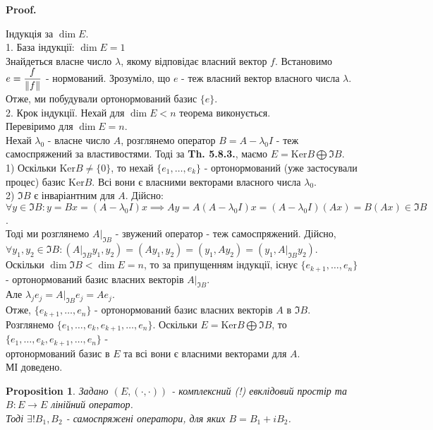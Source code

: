 \documentclass[a4paper, 10pt]{article}
\makeatletter
\def\qed{$\blacksquare$}
\def\ker#1{\textrm{Ker} {#1}}
\theoremstyle{theoremdd}
\theoremstyle{theoremdd}
\theoremstyle{theoremdd}
\theoremstyle{theoremdd}
\theoremstyle{theoremdd}
\newtheorem{proposition}[theorem]{Proposition}
\theoremstyle{theoremdd}
\theoremstyle{theoremdd}
\theoremstyle{theoremdd}
\renewenvironment{proof}[1][Proof.\\]{\par
\pushQED{\hfill \qed}%
\normalfont \topsep6\p@\@plus6\p@\relax
\trivlist
\item\relax
{\bfseries
#1\@addpunct{.}}\hspace\labelsep\ignorespaces
}{%
\popQED\endtrivlist\@endpefalse
}
\makeatother
\begin{document}
\begin{proof}
Індукція за $\dim E$.\\
1. База індукції: $\dim E = 1$\\
Знайдеться власне число $\lambda$, якому відповідає власний вектор $f$. Встановимо $e = \dfrac{f}{\norm{f}}$ - нормований. Зрозуміло, що $e$ - теж власний вектор власного числа $\lambda$.\\
Отже, ми побудували ортонормований базис $\{e\}$.
\bigskip \\
2. Крок індукції. Нехай для $\dim E < n$ теорема виконується.\\
Перевіримо для $\dim E = n$.\\
Нехай $\lambda_0$ - власне число $A$, розглянемо оператор $B = A - \lambda_0 I$ - теж самоспряжений за властивостями. Тоді за \textbf{Th. 5.8.3.}, маємо $E = \ker B \bigoplus \Im B$.\\
1) Оскільки $\ker B \neq \{0\}$, то нехай $\{e_1,\dots,e_k\}$ - ортонормований (уже застосували процес) базис $\ker B$. Всі вони є власними векторами власного числа $\lambda_0$.\\
2) $\Im B$ є інваріантним для $A$. Дійсно:\\
$\forall y \in \Im B: y = Bx = (A-\lambda_0 I)x \implies Ay = A(A-\lambda_0 I)x = (A-\lambda_0 I)(Ax) = B(Ax) \in \Im B$.\\
Тоді ми розглянемо  $A|_{\Im B}$ - звужений оператор - теж самоспряжений. Дійсно,\\
$\forall y_1,y_2 \in \Im B: (A|_{\Im B} y_1, y_2) = (Ay_1, y_2) = (y_1, Ay_2) = (y_1, A|_{\Im B} y_2)$.\\
Оскільки $\dim \Im B < \dim E = n$, то за припущенням індукції, існує $\{e_{k+1},\dots,e_n\}$ - ортонормований базис власних векторів $A|_{\Im B}$.\\
Але $\lambda_j e_j = A|_{\Im B} e_j = Ae_j$.\\
Отже, $\{e_{k+1},\dots,e_n\}$ - ортонормований базис власних векторів $A$ в $\Im B$.\\
Розглянемо $\{e_1,\dots,e_k,e_{k+1},\dots,e_n\}$. Оскільки $E = \ker B \bigoplus \Im B$, то $\{e_1,\dots,e_k,e_{k+1},\dots,e_n\}$ - \\ ортонормований базис в $E$ та всі вони є власними векторами для $A$.\\
МІ доведено.
\end{proof}

\begin{proposition}
Задано $(E,(\cdot,\cdot))$ - комплексний (!) евклідовий простір та $B: E \to E$ лінійний оператор.\\
Тоді $\exists! B_1,B_2$ - самоспряжені оператори, для яких $B = B_1 + i B_2$.
\end{proposition}
\end{document}
